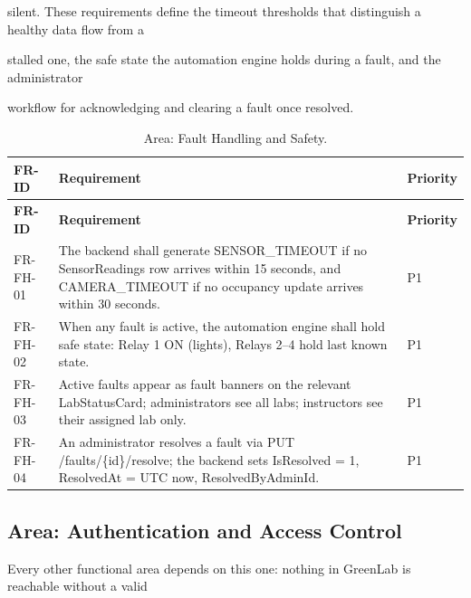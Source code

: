 silent. These requirements define the timeout thresholds that distinguish a healthy data flow from a

stalled one, the safe state the automation engine holds during a fault, and the administrator

workflow for acknowledging and clearing a fault once resolved.

\begin{longtable}{|L{2.0cm}|L{12.0cm}|L{1.5cm}|}
	\caption{Area: Fault Handling and Safety.} \label{tab:3-14}                                                                                                                                               \\
	\hline
	\textbf{FR-ID} & \textbf{Requirement}                                                                                                                                                 & \textbf{Priority} \\
	\hline
	\endfirsthead
	\hline
	\textbf{FR-ID} & \textbf{Requirement}                                                                                                                                                 & \textbf{Priority} \\
	\hline
	\endhead
	\hline
	\endfoot
	\hline
	\endlastfoot
	FR-FH-01       & The backend shall generate SENSOR\_TIMEOUT if no SensorReadings row arrives within 15 seconds, and CAMERA\_TIMEOUT if no occupancy update arrives within 30 seconds. & P1                \\
	\hline
	FR-FH-02       & When any fault is active, the automation engine shall hold safe state: Relay 1 ON (lights), Relays 2--4 hold last known state.                                       & P1                \\
	\hline
	FR-FH-03       & Active faults appear as fault banners on the relevant LabStatusCard; administrators see all labs; instructors see their assigned lab only.                           & P1                \\
	\hline
	FR-FH-04       & An administrator resolves a fault via PUT /faults/\{id\}/resolve; the backend sets IsResolved = 1, ResolvedAt = UTC now, ResolvedByAdminId.                          & P1                \\
	\hline
\end{longtable}


\subsection{Area: Authentication and Access Control}
Every other functional area depends on this one: nothing in GreenLab is reachable without a valid

